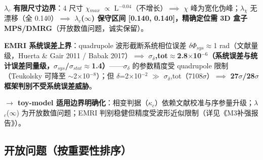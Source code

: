 \documentclass[UTF8,fontset=windows]{csoarticle}
\newcommand{\up}[1]{\ensuremath{^{#1}}}
\newcommand{\down}[1]{\ensuremath{_{#1}}}
\begin{document}
\textbf{\ensuremath{\lambda}\down{c} 有限尺寸边界}：4 尺寸 \ensuremath{\chi}\down{max} \ensuremath{\propto} L\up{-0.04}（不增长）\ensuremath{\implies} \ensuremath{\chi} 峰为宽化伪峰；\ensuremath{\lambda}\down{\chi{}} 无漂移（全 0.140）\ensuremath{\implies} \textbf{\ensuremath{\lambda}\down{c}(\ensuremath{\infty}) 保守区间 [0.140, 0.140]，精确定位需 3D 盒子 MPS/DMRG}（开放数值问题，诚实保留）。

\textbf{EMRI 系统误差上界}：quadrupole 波形截断系统相位误差 \ensuremath{\delta}\ensuremath{\Phi}\down{sys}\ensuremath{\approx}1 rad（文献量级，Huerta \& Gair 2011 / Babak 2017）\ensuremath{\implies} \textbf{\ensuremath{\sigma}\down{\delta{}},tot\ensuremath{\approx}2.8\ensuremath{\times}10\up{-6}（系统误差与统计误差同量级，\ensuremath{\sigma}\down{sys}/\ensuremath{\sigma}\down{stat}\ensuremath{\approx}1.4）}------\ensuremath{\sigma}\down{\delta{}} 的参数精度受 quadrupole 限制（Teukolsky 可降至 \ensuremath{\sim}2\ensuremath{\times}10\up{-8}）；但 \ensuremath{\delta}=2\ensuremath{\times}10\up{-2} \ensuremath{\gg} \ensuremath{\sigma}\down{\delta{}},tot（7108\ensuremath{\sigma}）\ensuremath{\implies} \textbf{27\ensuremath{\sigma}/28\ensuremath{\sigma} 框架判别不受系统误差威胁}。

\textbf{\ensuremath{\to} toy-model 适用边界明确化}：相变判据（\ensuremath{\kappa}\down{c}）依赖文献校准与序参量升级；\ensuremath{\lambda}\down{c}(\ensuremath{\infty}) 为开放数值问题；EMRI 判别稳健但精度受波形近似限制（详见《M3补强报告》）。

\subsection{开放问题（按重要性排序）}
\end{document}
